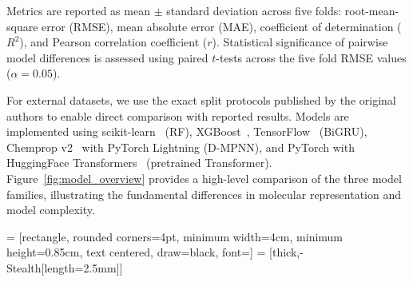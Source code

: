 \documentclass[11pt,a4paper]{article}
\begin{document}
Metrics are reported as mean $\pm$ standard deviation across five folds: root-mean-square error (RMSE), mean absolute error (MAE), coefficient of determination ($R^2$), and Pearson correlation coefficient ($r$).
Statistical significance of pairwise model differences is assessed using paired $t$-tests across the five fold RMSE values ($\alpha = 0.05$).

For external datasets, we use the exact split protocols published by the original authors to enable direct comparison with reported results.
Models are implemented using scikit-learn~\cite{pedregosa2011scikit} (RF), XGBoost~\cite{chen2016xgboost}, TensorFlow~\cite{abadi2016tensorflow} (BiGRU), Chemprop v2~\cite{yangAnalyzingLearnedMolecular2019} with PyTorch Lightning (D-MPNN), and PyTorch with HuggingFace Transformers~\cite{chithrananda2020chemberta} (pretrained Transformer).
Figure~\ref{fig:model_overview} provides a high-level comparison of the three model families, illustrating the fundamental differences in molecular representation and model complexity.


 = [rectangle, rounded corners=4pt, minimum width=4cm, minimum height=0.85cm, text centered, draw=black, font=\small]
 = [thick,-{Stealth[length=2.5mm]}]
\end{document}
